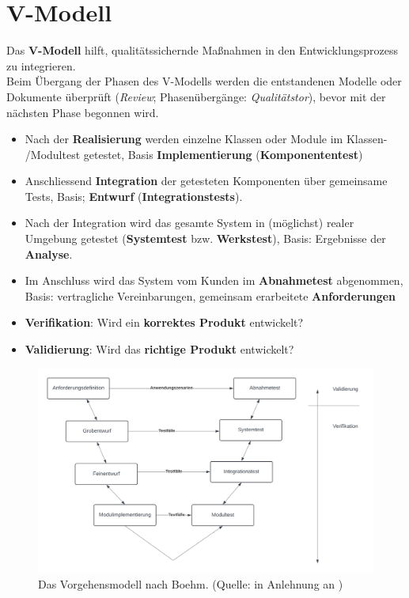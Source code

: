 \section{V-Modell}

\begin{tcolorbox}[title=V-Modell]
    Das \textbf{V-Modell} hilft, qualitätssichernde Maßnahmen in den Entwicklungsprozess zu integrieren.\\
    Beim Übergang der Phasen des V-Modells werden die entstandenen Modelle oder Dokumente überprüft (\textit{Review}; Phasenübergänge: \textit{Qualitätstor}), bevor mit der nächsten Phase begonnen wird.

    \begin{itemize}
        \item Nach der \textbf{Realisierung} werden einzelne Klassen oder Module im Klassen- /Modultest getestet, Basis \textbf{Implementierung} (\textbf{Komponententest})
        \item Anschliessend \textbf{Integration} der getesteten Komponenten über gemeinsame Tests, Basis; \textbf{Entwurf} (\textbf{Integrationstests}).
        \item Nach der Integration wird das gesamte System in (möglichst) realer Umgebung getestet (\textbf{Systemtest} bzw. \textbf{Werkstest}), Basis: Ergebnisse der \textbf{Analyse}.
        \item Im Anschluss wird das System  vom Kunden im \textbf{Abnahmetest} abgenommen, Basis: vertragliche Vereinbarungen, gemeinsam erarbeitete \textbf{Anforderungen}
    \end{itemize}

    \begin{itemize}
        \item \textbf{Verifikation}: Wird ein \textbf{korrektes Produkt} entwickelt?
        \item \textbf{Validierung}: Wird das \textbf{richtige Produkt} entwickelt?
    \end{itemize}


\end{tcolorbox}

\begin{figure}
    \centering
    \includegraphics[scale=0.3]{chapters/Glossar/img/vmodell}
    \caption{Das Vorgehensmodell nach Boehm. (Quelle: in Anlehnung an \cite[554, Abb. 20.11-2]{Bal08})}
    \label{fig:v-modell-cc}
\end{figure}
